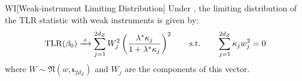 \begin{propositionp}{WI}[Weak-instrument Limiting Distribution]\label{prop:wi-weak}
    Under , the limiting distribution of the TLR statistic with weak instruments is given by:
    \begin{align}
    \mathrm{TLR}(\beta_0) \xrightarrow{{\scriptscriptstyle \mathrm{\;d\;}}} \sum_{j=1}^{2d_Z}  W_j^2\left(\frac{\lambda^*  \kappa_j}{1+\lambda^* \kappa_j}\right)^2 \qquad \text{s.t.} \qquad \sum_{j=1}^{2d_Z}\kappa_j w_j^2 = 0
\end{align}
where \(W\sim \mathfrak{N}(w,\boldsymbol{\iota}_{2d_Z})\) and \(W_j\) are the components of this vector.
\end{propositionp}
